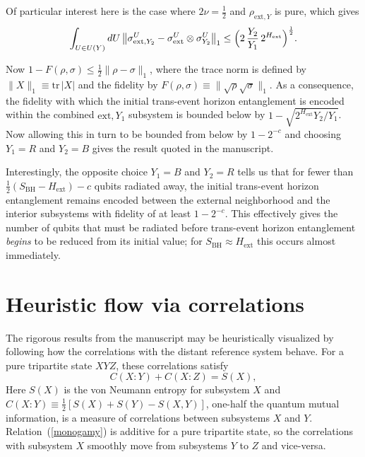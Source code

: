 \documentclass[twocolumn,aps,prl]{revtex4}
\begin{document}
Of particular interest here is the case where $2\nu=\frac{1}{2}$ and
$\rho_{\text{ext},Y}$ is pure, which gives
\begin{equation}
\int_{U\in U(Y)}dU\,\bigl\| \sigma_{\text{ext},Y_2}^U-
\sigma_{\text{ext}}^U\otimes \sigma_{Y_2}^U\bigr\|_1
\le \Bigl(2\,\frac{Y_2}{Y_1}\,2^{H_{\text{ext}}}\Bigr)^{\frac{1}{2}}.
\end{equation}

Now
$1-F(\rho,\sigma) \le \frac{1}{2}\|\rho-\sigma\|_1$, where the trace
norm is defined by $\|X\|_1\equiv \text{tr}\, |X|$ and the fidelity
by $F(\rho,\sigma)\equiv \|\sqrt{\rho}\sqrt{\sigma}\|_1$.
As a consequence, the fidelity with which the initial trans-event
horizon entanglement is encoded within the combined $\text{ext},Y_1$
subsystem is bounded below by $1-\sqrt{2^{H_{\text{ext}}} Y_2/Y_1}$.
Now allowing this in turn to be bounded from below by $1-2^{-c}$ and
choosing $Y_1=R$ and $Y_2=B$ gives the result quoted in the manuscript.

Interestingly, the opposite choice $Y_1=B$ and $Y_2=R$ tells us that
for fewer than $\frac{1}{2}(S_{\text{BH}}-H_{\text{ext}})-c$ qubits 
radiated away, the initial trans-event horizon entanglement remains
encoded between the external neighborhood and the interior subsystems
with fidelity of at least $1-2^{-c}$. This effectively gives the
number of qubits that must be radiated before trans-event horizon
entanglement {\it begins\/} to be reduced from its initial value; for
$S_{\text{BH}}\approx H_{\text{ext}}$ this occurs almost immediately.

\section{Heuristic flow via correlations}
\label{heuristic}

The rigorous results from the manuscript may be heuristically visualized
by following how the correlations with the distant reference system
behave. For a pure tripartite state $XYZ$, these correlations satisfy
\begin{equation}
C(X\!:\!Y)+C(X\!:\!Z) = S(X), \label{monogamy}
\end{equation}
Here $S(X)$ is the von Neumann entropy for subsystem $X$ and
$C(X\!:\!Y)\equiv\frac{1}{2}[S(X)+S(Y)-S(X,Y)]$, one-half the quantum
mutual information, is a measure of correlations between subsystems
$X$ and $Y$. Relation~(\ref{monogamy}) is additive for a pure
tripartite state, so the correlations with subsystem $X$ smoothly
move from subsystems $Y$ to $Z$ and vice-versa.
\end{document}
